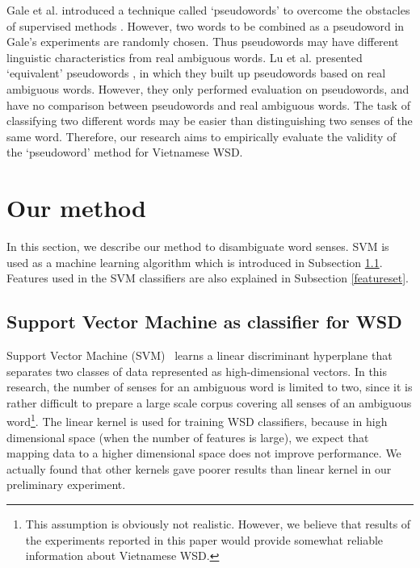 \documentclass[english]{jnlp_1.4}
\begin{document}
Gale et al. introduced a technique called `pseudowords' to overcome the obstacles of supervised methods \cite{Gale1992}.
However, two words to be combined as a pseudoword in Gale's experiments are randomly chosen.
Thus pseudowords may have different linguistic characteristics from real ambiguous words.
Lu et al. presented `equivalent' pseudowords \cite{Lu2006},
in which they built up pseudowords based on real ambiguous words. 
However, they only performed evaluation on pseudowords,
and have no comparison between pseudowords and real ambiguous words.
The task of classifying two different words may be easier than distinguishing two senses of the same word. 
Therefore, our research aims to empirically evaluate the validity of the `pseudoword' method for Vietnamese WSD.


\section{Our method} \label{section:method}
In this section, we describe our method to disambiguate word senses. 
SVM is used as a machine learning algorithm which is introduced in Subsection \ref{svm}. 
Features used in the SVM classifiers are also explained in Subsection \ref{featureset}. 

\subsection{Support Vector Machine as classifier for WSD}
\label{svm}
Support Vector Machine (SVM)~\cite{Cortes1995} learns a linear discriminant hyperplane that separates two classes of data represented as high-dimensional vectors.
In this research, the number of senses for an ambiguous word is limited to two, 
since it is rather difficult to prepare a large scale corpus covering all senses of an ambiguous word\footnote{This assumption is obviously not realistic.
However, 
we believe that results of the experiments reported in this paper would provide somewhat reliable information about Vietnamese WSD.}. 
The linear kernel is used for training WSD classifiers, because in high dimensional space (when the number of features is large),
we expect that mapping data to a higher dimensional space does not improve performance. 
We actually found that other kernels gave poorer results than linear kernel in our preliminary experiment. 
\end{document}
